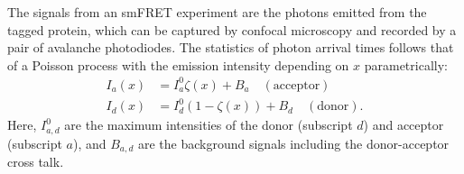 \documentclass[journal=jpcbfk,manuscript=article,layout=twocolumn,articletitle=true]{achemso}
\begin{document}
The signals from an smFRET experiment are the photons emitted from the tagged protein, which can be captured by confocal microscopy and recorded by a pair of avalanche photodiodes.\cite{Hanson:2007fga} The statistics of photon arrival times follows that of a Poisson process with the emission intensity depending on $x$ parametrically:
\begin{align}
\label{eq:Intensity}
I_a(x) &= I_a^0\zeta(x) + B_a \quad (\text{acceptor}) \\
I_d(x) &= I_d^0(1-\zeta(x)) + B_d \quad (\text{donor}).
\end{align}
Here, $I^0_{a,d}$ are the maximum intensities of the donor (subscript $d$) and acceptor (subscript $a$), and $B_{a,d}$ are the background signals including the donor-acceptor cross talk.\cite{Watkins:2004cia} 
\end{document}
